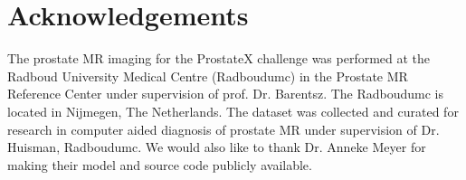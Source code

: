 \documentclass[num-refs]{wiley-article}
\begin{document}
\section{Acknowledgements}
The prostate MR imaging for the ProstateX challenge was performed at the Radboud University Medical Centre (Radboudumc) in the Prostate MR Reference Center under supervision of prof. Dr. Barentsz. The Radboudumc is located in Nijmegen, The Netherlands. The dataset was collected and curated for research in computer aided diagnosis of prostate MR under supervision of Dr. Huisman, Radboudumc. We would also like to thank Dr. Anneke Meyer for making their model and source code publicly available.





\end{document}
